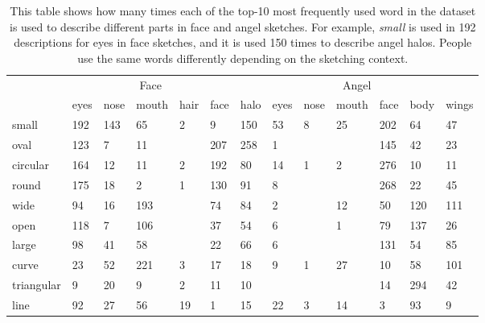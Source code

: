 

\begin{table}[!h]
\begin{minipage}{1\textwidth}
\begin{center}
{\small
\begin{tabular}{p{5em} | p{1.5em}p{1.5em}p{2em}p{1.5em}p{1.5em} | p{1.5em}p{1.5em}p{1.5em}p{2em}p{1.5em}p{1.5em}p{1.5em} }
\toprule
~ & \multicolumn{5}{c}{Face} & \multicolumn{7}{c}{Angel}\\
~ & eyes & nose & mouth & hair & face & halo & eyes & nose & mouth & face & body & wings  \\
\midrule
small & 192 & 143 & 65 & 2 & 9 & 150 & 53 & 8 & 25 & 202 & 64 & 47 \\
oval & 123 & 7 & 11 &   & 207 & 258 & 1 &   &   & 145 & 42 & 23 \\
circular & 164 & 12 & 11 & 2 & 192 & 80 & 14 & 1 & 2 & 276 & 10 & 11 \\
round & 175 & 18 & 2 & 1 & 130 & 91 & 8 &   &   & 268 & 22 & 45 \\
wide & 94 & 16 & 193 &   & 74 & 84 & 2 &   & 12 & 50 & 120 & 111 \\
open & 118 & 7 & 106 &   & 37 & 54 & 6 &   & 1 & 79 & 137 & 26 \\
large & 98 & 41 & 58 &   & 22 & 66 & 6 &   &   & 131 & 54 & 85 \\
curve & 23 & 52 & 221 & 3 & 17 & 18 & 9 & 1 & 27 & 10 & 58 & 101 \\
triangular & 9 & 20 & 9 & 2 & 11 & 10 &   &   &   & 14 & 294 & 42 \\
line & 92 & 27 & 56 & 19 & 1 & 15 & 22 & 3 & 14 & 3 & 93 & 9\\
\bottomrule
\end{tabular}}
\caption{This table shows how many times each of the top-10 most frequently used word in the dataset is used to describe different parts in face and angel sketches. For example, \textit{small} is used in 192 descriptions for eyes in face sketches, and it is used 150 times to describe angel halos. People use the same words differently depending on the sketching context.}
\label{table:parts_share_description}
\end{center}
\end{minipage}
\end{table}

